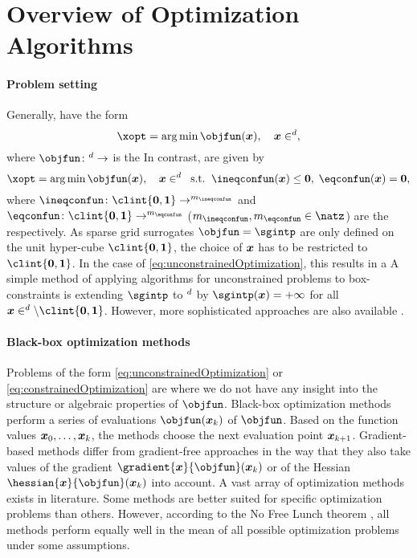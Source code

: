 \section{Overview of Optimization Algorithms}
\label{sec:51algorithms}

\paragraph{Problem setting}

Generally,  have the form
\begin{equation}
  \label{eq:unconstrainedOptimization}
  \xopt = \argmin \objfun(\*x),\quad
  \*x \in \real^d,
\end{equation}
where $\objfun\colon \real^d \to \real$ is the 
In contrast,  are given by
\begin{equation}
  \label{eq:constrainedOptimization}
  \xopt = \argmin \objfun(\*x),\quad
  \*x \in \real^d\;\;\text{s.t.}\;\;
  \ineqconfun(\*x) \le \*0,\;
  \eqconfun(\*x) = \*0,
\end{equation}
where
$\ineqconfun\colon \clint{\*0, \*1} \to \real^{m_{\ineqconfun}}$ and
$\eqconfun\colon \clint{\*0, \*1} \to \real^{m_{\eqconfun}}$
($m_{\ineqconfun}, m_{\eqconfun} \in \natz$)
are the  respectively.
As sparse grid surrogates $\objfun = \sgintp$ are only defined on the
unit hyper-cube $\clint{\*0, \*1}$,
the choice of ${\boldsymbol{x}}$ has to be restricted to $\clint{\*0, \*1}$.
In the case of \eqref{eq:unconstrainedOptimization},
this results in a 
A simple method of applying algorithms for unconstrained problems
to box-constraints is extending $\sgintp$ to $\real^d$ by
$\sgintp(\*x) = +\infty$ for all $\*x \in \real^d \setminus \clint{\*0, \*1}$.
However, more sophisticated
approaches are also available \cite{More87Optimization}.

\paragraph{Black-box optimization methods}

Problems of the form \eqref{eq:unconstrainedOptimization} or
\eqref{eq:constrainedOptimization} are 
where we do not have any insight into the structure or algebraic
properties of $\objfun$.
Black-box optimization methods perform a series of evaluations
$\objfun(\*x_k)$ of $\objfun$.
Based on the function values ${\boldsymbol{x}}_0, \dotsc, {\boldsymbol{x}}_k$,
the methods choose the next evaluation point ${\boldsymbol{x}}_{k+1}$.
Gradient-based methods differ from gradient-free approaches
in the way that they also take values of the gradient
$\gradient{\*x}{\objfun}(\*x_k)$ or of the Hessian
$\hessian{\*x}{\objfun}(\*x_k)$ into account.
A vast array of optimization methods exists in literature.
Some methods are better suited for specific optimization problems
than others.
However, according to the No Free Lunch theorem \cite{Wolpert97No},
all methods perform equally well in the mean of all possible
optimization problems under some assumptions.

